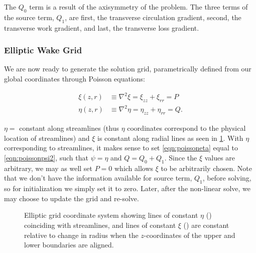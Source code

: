 \noindent The \(Q_0\) term is a result of the axisymmetry of the problem.
%
The three terms of the source term, \(Q_1\), are first, the transverse circulation gradient, second, the transverse work gradient, and last, the transverse loss gradient.
%



\subsubsection{Elliptic Wake Grid}
\label{ssec:generateellipticgrid}

We are now ready to generate the solution grid, parametrically defined from our global coordinates through Poisson equations:

\begin{align}
    \label{eqn:poissonxi}
    \xi(z,r) &\equiv \nabla^2 \xi = \xi_{zz} + \xi_{rr} = P \\
    \label{eqn:poissoneta}
    \eta(z,r) &\equiv \nabla^2\eta = \eta_{zz} + \eta_{rr} = Q.
\end{align}


\where \(\eta =\) constant along streamlines (thus \(\eta\) coordinates correspond to the physical location of streamlines) and \(\xi\) is constant along radial lines as seen in \cref{fig:gridcoordinates}.
%
With \(\eta\) corresponding to streamlines, it makes sense to set \cref{eqn:poissoneta} equal to \cref{eqn:poissonpsi2}, such that \(\psi = \eta\) and \(Q = Q_0 + Q_1\).
%
Since the \(\xi\) values are arbitrary, we may as well set \(P=0\) which allows \(\xi\) to be arbitrarily chosen.
%
Note that we don't have the information available for source term, \(Q_1\), before solving, so for initialization we simply set it to zero.
%
Later, after the non-linear solve, we may choose to update the grid and re-solve.

\begin{figure}[h!]
    \centering
    
    \caption{Elliptic grid coordinate system showing lines of constant \(\eta\) () coinciding with streamlines, and lines of constant \(\xi\) () are constant relative to change in radius when the \(z\)-coordinates of the upper and lower boundaries are aligned.}
    \label{fig:gridcoordinates}
\end{figure}


